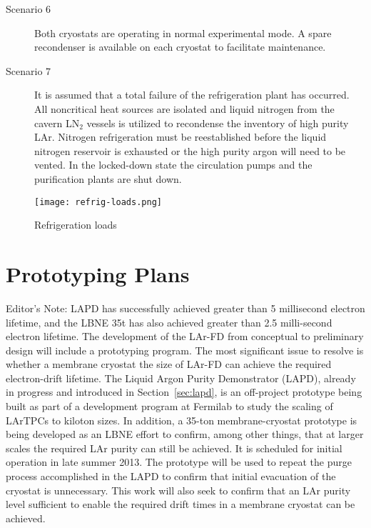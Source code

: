 \begin{description}
\item[Scenario 6]
Both cryostats are operating in normal experimental mode.  A spare recondenser is available on each cryostat to facilitate maintenance.

\item[Scenario 7]
It is assumed that a total failure of the refrigeration plant has occurred. All noncritical heat sources are isolated and liquid nitrogen from the cavern LN$_2$ vessels is utilized to recondense the inventory of high purity LAr. Nitrogen refrigeration must be reestablished before the liquid nitrogen reservoir is exhausted or the high purity argon will need to be vented. In the locked-down state the circulation pumps and the purification plants are shut down.
\end{description}

\begin{figure}[htbp]
\centering
\texttt{[image: refrig-loads.png]}
\caption{Refrigeration loads}
\label{fig:Refrigeration-loads}
\end{figure}

\begin{figure}[htbp]
\centering
\end{figure}


\section{Prototyping Plans}

\notestart
Editor's Note:  LAPD has successfully achieved greater than 5 millisecond electron lifetime, and the LBNE 35t has also achieved greater than 2.5 milli-second electron lifetime. 
\notestop
The development of the LAr-FD from conceptual to preliminary design will include a prototyping program. The most significant issue to resolve is whether a membrane cryostat the size of LAr-FD can achieve the required electron-drift lifetime. The Liquid Argon Purity Demonstrator (LAPD), already in progress and introduced in Section~\ref{sec:lapd}, is an off-project prototype being built as part of a development program at Fermilab to study the scaling of LArTPCs to kiloton sizes. In addition, a 35-ton membrane-cryostat prototype is being developed as an LBNE effort to confirm, among other things, that at larger scales the required LAr purity can still be achieved. It is scheduled for initial operation in late summer 2013. The prototype will be used to repeat the purge process accomplished in the LAPD to confirm that initial evacuation of the cryostat is unnecessary. This work will also seek to confirm that an LAr purity level sufficient to enable the required drift times in a membrane cryostat can be achieved.




